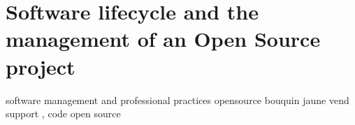 \chapter{Software lifecycle and the management of an Open Source project}
\label{ch:sdlc}

software management and professional practices
opensource bouquin jaune
vend support , code open source